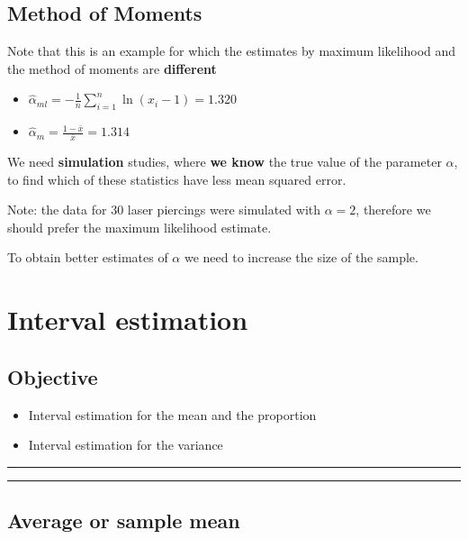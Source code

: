 \documentclass[
]{book}
\providecommand{\tightlist}{%
  \setlength{\itemsep}{0pt}\setlength{\parskip}{0pt}}
\begin{document}
\hypertarget{method-of-moments-10}{%
\section{Method of Moments}\label{method-of-moments-10}}

Note that this is an example for which the estimates by maximum likelihood and the method of moments are \textbf{different}

\begin{itemize}
\item
  \(\hat{\alpha}_{ml}=-\frac{1}{n}\sum_{i=1}^n \ln (x_i-1)=1.320\)
\item
  \(\hat{\alpha}_m=\frac{1-\bar{x}}{\bar{x}}=1.314\)
\end{itemize}

We need \textbf{simulation} studies, where \textbf{we know} the true value of the parameter \(\alpha\), to find which of these statistics have less mean squared error.

Note: the data for \(30\) laser piercings were simulated with \(\alpha=2\), therefore we should prefer the maximum likelihood estimate.

To obtain better estimates of \(\alpha\) we need to increase the size of the sample.

\hypertarget{interval-estimation}{%
\chapter{Interval estimation}\label{interval-estimation}}

\hypertarget{objective-12}{%
\section{Objective}\label{objective-12}}

\begin{itemize}
\tightlist
\item
  Interval estimation for the mean and the proportion
\item
  Interval estimation for the variance
\end{itemize}

\begin{center}\rule{0.5\linewidth}{0.5pt}\end{center}

\begin{center}\rule{0.5\linewidth}{0.5pt}\end{center}

\hypertarget{average-or-sample-mean-1}{%
\section{Average or sample mean}\label{average-or-sample-mean-1}}
\end{document}

